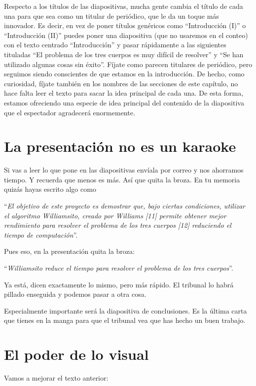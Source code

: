 Respecto a los títulos de las diapositivas, mucha gente cambia el título de cada una para que sea como un titular de periódico, que le da un toque más innovador.  Es decir, en vez de poner títulos genéricos como ``Introducción (I)'' o ``Introducción (II)'' puedes poner una diapositiva (que no usaremos en el conteo) con el texto centrado ``Introducción'' y pasar rápidamente a las siguientes tituladas ``El problema de los tres cuerpos es muy difícil de resolver'' y ``Se han utilizado algunas cosas sin éxito''. Fíjate como parecen titulares de periódico, pero seguimos siendo conscientes de que estamos en la introducción. De hecho, como curiosidad, fíjate también en los nombres de las secciones de este capítulo, no hace falta leer el texto para sacar la idea principal de cada una. De esta forma, estamos ofreciendo una especie de idea principal del contenido de la diapositiva que el espectador agradecerá enormemente.

\section{La presentación no es un karaoke}

Si vas a leer lo que pone en las diapositivas envíala por correo y nos ahorramos tiempo. Y recuerda que menos es más. Así que quita la broza. En tu memoria quizás hayas escrito algo como 

``\textit{El objetivo de este proyecto es demostrar que, bajo ciertas condiciones, utilizar el algoritmo Williamsito, creado por Williams [11] permite obtener mejor rendimiento para resolver el problema de los tres cuerpos [12] reduciendo el tiempo de computación}''. 

Pues eso, en la presentación quita la broza: 

``\textit{Williamsito reduce el tiempo para resolver el problema de los tres cuerpos}''. 

Ya está, dicen exactamente lo mismo, pero más rápido. El tribunal lo habrá pillado enseguida y podemos pasar a otra cosa.

Especialmente importante será la diapositiva de conclusiones. Es la última carta que tienes en la manga para que el tribunal vea que has hecho un buen trabajo.

\section{El poder de lo visual}
Vamos a mejorar el texto anterior: 

